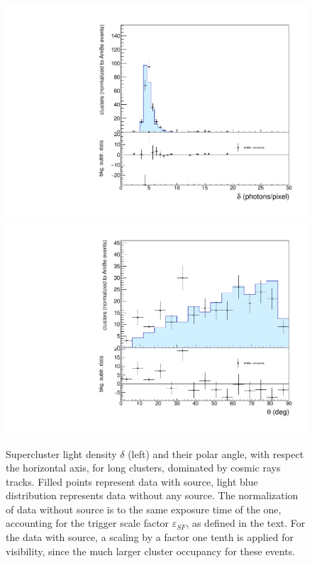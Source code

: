 \begin{figure}[ht]
  \begin{center}
  \includegraphics[width=0.45\linewidth]{figures/density_cosmics}
  \includegraphics[width=0.45\linewidth]{figures/inclination_cosmics}

  \caption{Supercluster light density $\delta$ (left) and their polar
    angle, with respect the horizontal axis, for long clusters,
    dominated by cosmic rays tracks.  Filled points represent data
    with \ambe source, light blue distribution represents data without
    any source.  The normalization of data without source is to the same
    exposure time of the \ambe one, accounting for the trigger scale
    factor $\varepsilon_{SF}$, as defined in the text. For the data
    with \fe source, a scaling by a factor one tenth is applied for
    visibility, since the much larger cluster occupancy for these
    events.  \label{fig:cosmics}}

\end{center}
\end{figure}
